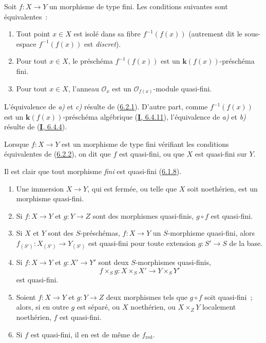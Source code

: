 \begin{corollary}[6.2.2]
\label{II.6.2.2-fr}
Soit $f:X\to Y$ un morphisme de type fini. Les conditions suivantes sont
équivalentes~:
\begin{enumerate}
\item[\textup{a)}] Tout point $x\in X$ est isolé dans sa fibre $f^{-1}(f(x))$
\textup{(autrement dit le sous-espace $f^{-1}(f(x))$ est \emph{discret})}.
\item[\textup{b)}] Pour tout $x\in X$, le préschéma $f^{-1}(f(x))$ est un
$\boldsymbol{k}(f(x))$-préschéma fini.
\item[\textup{c)}] Pour tout $x\in X$, l'anneau $\mathcal{O}_x$ est un
$\mathcal{O}_{f(x)}$-module quasi-fini.
\end{enumerate}
\end{corollary}

L'équivalence de \emph{a)} et \emph{c)} résulte de
(\hyperref[II.6.2.1-fr]{6.2.1}). D'autre part, comme $f^{-1}(f(x))$ est un
$\boldsymbol{k}(f(x))$-préschéma algébrique (\hyperref[I.6.4.11-fr]{\textbf{I}, 6.4.11}),
l'équivalence de \emph{a)} et \emph{b)} résulte de (\hyperref[I.6.4.4-fr]{\textbf{I}, 6.4.4}).

\begin{definition}[6.2.3]
\label{II.6.2.3-fr}
Lorsque $f:X\to Y$ est un morphisme de type fini vérifiant les conditions
équivalentes de \textup{(\hyperref[II.6.2.2-fr]{6.2.2})}, on dit que $f$ est
quasi-fini, ou que $X$ est quasi-fini sur $Y$.
\end{definition}

Il est clair que tout morphisme \emph{fini} est quasi-fini
(\hyperref[II.6.1.8-fr]{6.1.8}).

\begin{proposition}[6.2.4]
\label{II.6.2.4-fr}
\begin{enumerate}
\item[\textup{(i)}] Une immersion $X\to Y$, qui est fermée, ou telle que $X$ soit
noethérien, est un morphisme quasi-fini.
\item[\textup{(ii)}] Si $f:X\to Y$ et $g:Y\to Z$ sont des morphismes quasi-finis,
$g\circ f$ est quasi-fini.
\item[\textup{(iii)}] Si $X$ et $Y$ sont des $S$-préschémas, $f:X\to Y$ un
$S$-morphisme quasi-fini, alors $f_{(S')}:X_{(S')}\to Y_{(S')}$ est quasi-fini
pour toute extension $g:S'\to S$ de la base.
\item[\textup{(iv)}] Si $f:X\to Y$ et $g:X'\to Y'$ sont deux $S$-morphismes
quasi-finis,
\[
f\times_S g:X\times_S X'\to Y\times_S Y'
\]
est quasi-fini.
\item[\textup{(v)}] Soient $f:X\to Y$ et $g:Y\to Z$ deux morphismes tels que $g\circ
f$ soit quasi-fini~; alors, si en outre $g$ est séparé, ou $X$ noethérien, ou
$X\times_ZY$ localement noethérien, $f$ est quasi-fini.
\item[\textup{(vi)}] Si $f$ est quasi-fini, il en est de même de $f_{\mathrm{red}}$.
\end{enumerate}
\end{proposition}

